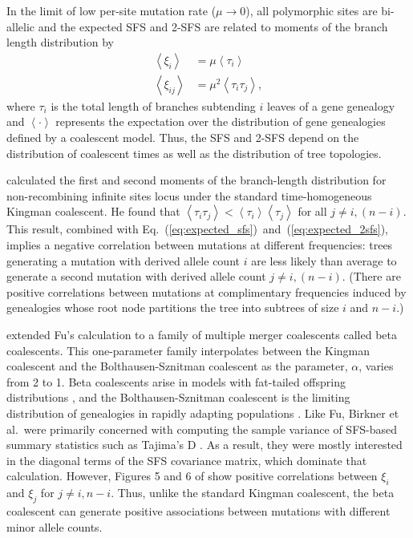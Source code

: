 \documentclass[11pt, letterpaper]{article}   	%
\newcommand{\eqs}[2]{Eq.~(\ref{#1})~and~(\ref{#2})}
\newcommand{\E}[1]{\left< #1 \right>}
\begin{document}
In the limit of low per-site mutation rate ($\mu\to0$), all polymorphic sites are bi-allelic and the expected SFS and 2-SFS are related to moments of the branch length distribution by
\begin{align}
    \E{\xi_i} &= \mu \E{\tau_i} \label{eq:expected_sfs} \\
    \E{\xi_{ij}} &= \mu^2 \E{\tau_i \tau_j},
    \label{eq:expected_2sfs}
\end{align}
where $\tau_i$ is the total length of branches subtending $i$ leaves of a gene genealogy and $\E{\cdot}$ represents the expectation over the distribution of gene genealogies defined by a coalescent model.
Thus, the SFS and 2-SFS depend on the distribution of coalescent times as well as the distribution of tree topologies.

\cite{Fu1995} calculated the first and second moments of the branch-length distribution for non-recombining infinite sites locus under the standard time-homogeneous Kingman coalescent.
He found that $\E{\tau_i \tau_j} < \E{\tau_i}\E{\tau_j}$ for all $j \neq i, (n-i)$.
This result, combined with \eqs{eq:expected_sfs}{eq:expected_2sfs}, implies a negative correlation between mutations at different frequencies: trees generating a mutation with derived allele count $i$ are less likely than average to generate a second mutation with derived allele count $j \neq i, (n-i)$.
(There are positive correlations between mutations at complimentary frequencies induced by genealogies whose root node partitions the tree into subtrees of size $i$ and $n-i$.)

\cite{BirknerEtAl2013} extended Fu's calculation to a family of multiple merger coalescents called beta coalescents.
This one-parameter family interpolates between the Kingman coalescent and the Bolthausen-Sznitman coalescent as the parameter, $\alpha$, varies from 2 to 1.
Beta coalescents arise in models with fat-tailed offspring distributions \autocite{Schweinsberg2003}, and the Bolthausen-Sznitman coalescent is the limiting distribution of genealogies in rapidly adapting populations \autocite{NeherHallatscheck2013}.
Like Fu, Birkner et al.\ were primarily concerned with computing the sample variance of SFS-based summary statistics such as Tajima's D \autocite{Tajima1989}.
As a result, they were mostly interested in the diagonal terms of the SFS covariance matrix, which dominate that calculation.
However, Figures 5 and 6 of \cite{BirknerEtAl2013} show positive correlations between $\xi_i$ and $\xi_j$ for $j \neq i, n-i$.
Thus, unlike the standard Kingman coalescent, the beta coalescent can generate positive associations between mutations with different minor allele counts.
\end{document}
